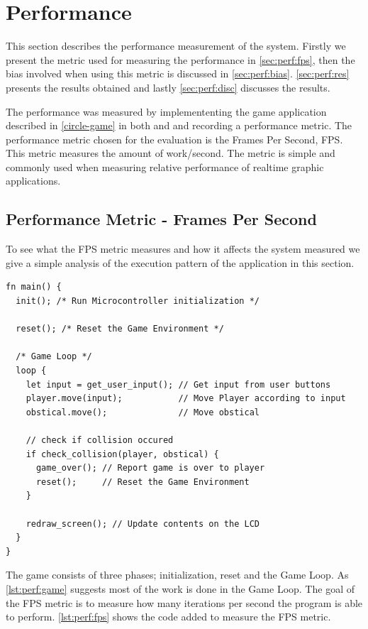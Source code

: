 \section{Performance}

This section describes the performance measurement of the system.
Firstly we present the metric used for measuring the performance in \autoref{sec:perf:fps}, then the bias involved when using this metric is discussed in \autoref{sec:perf:bias}.
\autoref{sec:perf:res} presents the results obtained and lastly \autoref{sec:perf:disc} discusses the results.

The performance was measured by implemententing the game application described in \autoref{circle-game} in both {\C} and {\rust} and recording a performance metric.
The performance metric chosen for the evaluation is the Frames Per Second, FPS.
This metric measures the amount of work/second.
The metric is simple and commonly used when measuring relative performance of realtime graphic applications.

\subsection{Performance Metric - Frames Per Second}
\label{sec:perf:fps}
To see what the FPS metric measures and how it affects the system measured we give a simple analysis of the execution pattern of the application in this section.

\begin{listing}[H]
  \begin{verbatim}
fn main() {
  init(); /* Run Microcontroller initialization */

  reset(); /* Reset the Game Environment */

  /* Game Loop */
  loop {
    let input = get_user_input(); // Get input from user buttons
    player.move(input);           // Move Player according to input
    obstical.move();              // Move obstical

    // check if collision occured
    if check_collision(player, obstical) {
      game_over(); // Report game is over to player
      reset();     // Reset the Game Environment
    }

    redraw_screen(); // Update contents on the LCD
  }
}
  \end{verbatim}
  \caption{}
  \label{lst:perf:game}
\end{listing}

The game consists of three phases; initialization, reset and the Game Loop.
As \autoref{lst:perf:game} suggests most of the work is done in the Game Loop.
The goal of the FPS metric is to measure how many iterations per second the program is able to perform.
\autoref{lst:perf:fps} shows the code added to measure the FPS metric.

